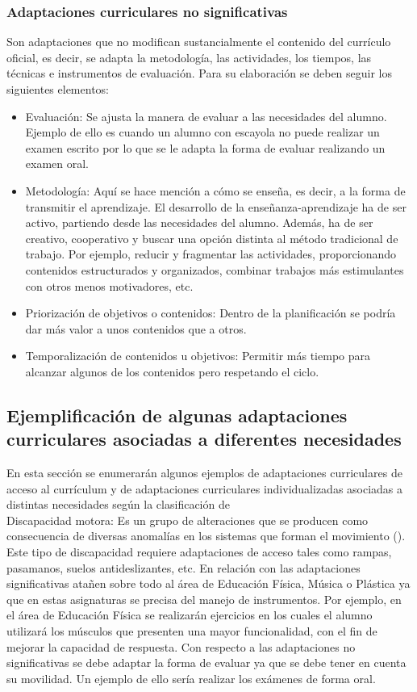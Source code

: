 \subsubsection{Adaptaciones curriculares no significativas}
Son adaptaciones que no modifican sustancialmente el contenido del currículo oficial, es decir, se adapta la metodología, las actividades, los tiempos, las técnicas e instrumentos de evaluación. Para su elaboración se deben seguir los siguientes elementos:
\begin{itemize}
    \item Evaluación: Se ajusta la manera de evaluar a las necesidades del alumno. Ejemplo de ello es cuando un alumno con escayola no puede realizar un examen escrito por lo que se le adapta la forma de evaluar realizando un examen oral.
    \item Metodología: Aquí se hace mención a cómo se enseña, es decir, a la forma de transmitir el aprendizaje. El desarrollo de la enseñanza-aprendizaje ha de ser activo, partiendo desde las necesidades del alumno. Además, ha de ser creativo, cooperativo y buscar una opción distinta al método tradicional de trabajo. Por ejemplo, reducir y fragmentar las actividades, proporcionando contenidos estructurados y organizados, combinar trabajos más estimulantes con otros menos motivadores, etc.
    \item Priorización de objetivos o contenidos: Dentro de la planificación se podría dar más valor a unos contenidos que a otros.
    \item Temporalización de contenidos u objetivos: Permitir más tiempo para alcanzar algunos de los contenidos pero respetando el ciclo.
\end{itemize}

\subsection{Ejemplificación de algunas adaptaciones curriculares asociadas a diferentes necesidades }

En esta sección se enumerarán algunos ejemplos de adaptaciones curriculares de acceso al currículum y de adaptaciones curriculares individualizadas asociadas a distintas necesidades según la clasificación de \citep*{adaptacionUNED}
\\

Discapacidad motora: Es un grupo de alteraciones que se producen como consecuencia de diversas anomalías en los sistemas que forman el movimiento (\citeauthor{disMotora}). Este tipo de discapacidad requiere  adaptaciones de acceso tales como rampas, pasamanos, suelos antideslizantes, etc. En relación con las adaptaciones significativas atañen sobre todo al área de Educación Física, Música o Plástica ya que en estas asignaturas se precisa del manejo de instrumentos. Por ejemplo, en el área de Educación Física se realizarán ejercicios en los cuales el alumno utilizará los músculos que presenten una mayor funcionalidad, con el fin de mejorar la capacidad de respuesta. Con respecto a las adaptaciones no significativas se debe adaptar la forma de evaluar ya que se debe tener en cuenta su movilidad. Un ejemplo de ello sería realizar los exámenes de forma oral.
\\

